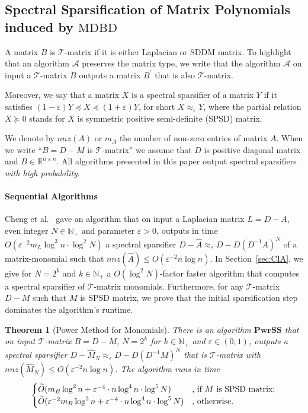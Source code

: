 \documentclass[11pt]{article}
\newcommand{\SDDM}{\mathrm{SDDM}}
\newcommand{\SPSD}{\mathrm{SPSD}}
\newcommand{\MDBD}{\mathrm{MDBD}}
\newcommand{\GL}{\mathcal{T}}
\newcommand{\PwrSS}{\mathrm{\mathbf{PwrSS}}}
\newcommand{\wO}{\widetilde{O}}
\newcommand{\hM}{\widehat{M}}
\newcommand{\hA}{\widehat{A}}
\newcommand{\Di}{D^{-1}}
\newcommand{\prm}{\prime}
\newcommand{\N}{\mathbb{N}}
\newcommand{\R}{\mathbb{R}}
\newcommand{\eps}{\epsilon}
\renewcommand{\leq}{\leqslant}
\renewcommand{\eps}{\varepsilon}
\newtheorem{thm}{Theorem}  \newtheorem{fact}[thm]{Fact}
\numberwithin{thm}{section}
\begin{document}
\subsection{Spectral Sparsification of Matrix Polynomials induced by $\MDBD$}\label{subsec:SSMP}

A matrix $B$ is $\GL$-matrix if it is either Laplacian or $\SDDM$ matrix. To highlight that an algorithm $\mathcal{A}$ preserves the matrix type, we write that the algorithm $\mathcal{A}$ on input a $\GL$-matrix $B$ outputs a matrix $B^\prm$ that is also $\GL$-matrix.

Moreover, we say that a matrix $X$ is a spectral sparsifier of a matrix $Y$ if it
satisfies $(1-\eps)Y\preceq X\preceq(1+\eps)Y$, for short $X\approx_{\eps}Y$,
where the partial relation $X\succeq0$ stands for $X$ is symmetric
positive semi-definite (SPSD) matrix.

We denote by $nnz(A)$ or $m_A$ the number of non-zero entries of matrix $A$. When we write ``$B=D-M$ is $\GL$-matrix'' we assume that $D$ is positive diagonal matrix and $B\in\R^{n\times n}$. All algorithms presented in this paper output spectral sparsifiers \emph{with high probability}.

\paragraph{Sequential Algorithms}
Cheng et al.~\cite[Theorem 1.5]{arxivCCLPT15} gave an algorithm that on input a Laplacian matrix $L=D-A$, even integer $N\in\N_+$ and parameter $\eps>0$, outputs in time $O(\eps^{-2}m_L\log^{3}n\cdot\log^2{N})$ a spectral sparsifier $D-\hA\approx_{\eps}D-D(\Di A)^N$ of a matrix-monomial such that $nnz(\hA)\leq O(\eps^{-2}n\log n)$. In Section~\ref{sec:CIA}, we give for $N=2^k$ and $k\in\N_+$ a $O(\log^{2}N)$-factor faster algorithm that computes a spectral sparsifier of $\GL$-matrix monomials. Furthermore, for any $\GL$-matrix $D-M$ such that $M$ is $\SPSD$ matrix, we prove that the initial sparsification step dominates the algorithm's runtime.

\begin{thm}[Power Method for Monomials]\label{thmMyGLN}
There is an algorithm $\PwrSS$ that on input $\GL$-matrix $B=D-M$, $N=2^{k}$ for $k\in\N_+$ and $\eps\in(0,1)$, outputs a spectral sparsifier
$D-\hM_{N}\approx_{\eps}D-D(\Di M)^{N}$ that is $\GL$-matrix with $nnz(\hM_{N})\leq O(\eps^{-2}n\log n)$.
The algorithm runs in time
\[
\begin{cases}
\wO(m_{B}\log^{2}n+\eps^{-4}\cdot n\log^{4}n\cdot\log^{5}N) & \text{, if \ensuremath{M} is \ensuremath{\SPSD} matrix};\\
\wO(\eps^{-2}m_{B}\log^{3}n + \eps^{-4}\cdot n\log^{4}n\cdot\log^{5}N) & \text{, otherwise.}
\end{cases}
\]
\end{thm}
\end{document}
